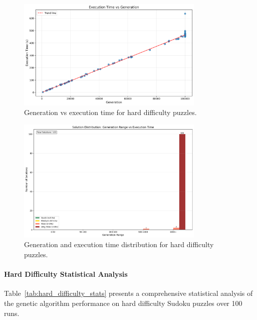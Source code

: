 \begin{figure}[H]
\centering
\includegraphics[width=0.8\textwidth]{resources/generation_vs_execution_time_hard.png}
\caption{Generation vs execution time for hard difficulty puzzles.}
\label{fig:generation_vs_execution_time_hard}
\end{figure}

\begin{figure}[H]
\centering
\includegraphics[width=0.8\textwidth]{resources/generation_execution_time_bars_hard.png}
\caption{Generation and execution time distribution for hard difficulty puzzles.}
\label{fig:generation_execution_time_bars_hard}
\end{figure}

\paragraph{Hard Difficulty Statistical Analysis}

Table~\ref{tab:hard_difficulty_stats} presents a comprehensive statistical analysis of the genetic algorithm performance on hard difficulty Sudoku puzzles over 100 runs.

